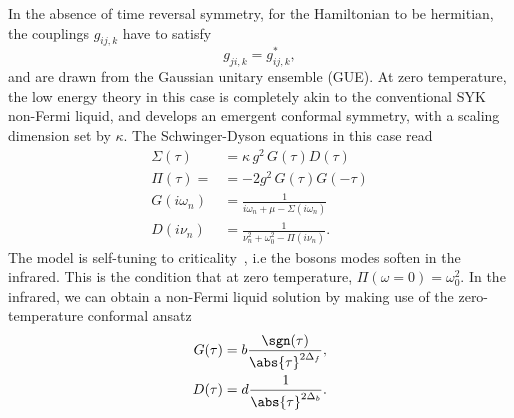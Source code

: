 \par
In the absence of time reversal symmetry, for the Hamiltonian to be hermitian, the couplings $g_{ij,k}$ have to satisfy 
\begin{equation}
    g_{ji,k} = g^*_{ij,k},
\end{equation}
and are drawn from the Gaussian unitary ensemble (GUE). At zero temperature, the low energy theory in this case is completely akin to the conventional SYK non-Fermi liquid, and develops an emergent conformal symmetry, with a scaling dimension set by $\kappa$. 
The Schwinger-Dyson equations in this case read
\begin{subequations}
\begin{align}
    \Sigma(\tau) &= \kappa \, g^2 \, G(\tau) D(\tau) \\
    \Pi(\tau) = &= -2g^2 \, G(\tau)G(-\tau) \\
    G(i\omega_n) &= \frac{1}{i\omega_n + \mu - \Sigma(i\omega_n)} \\
    D(i\nu_n) &= \frac{1}{\nu_n^2 + \omega_0^2 - \Pi(i\nu_n)} .
    \label{eq:SchDysEqnsYSYK_Imag}
\end{align}
\end{subequations}
The model is self-tuning to criticality~\cite{esterlis2019cooper}, i.e the bosons modes soften in the infrared. This is the condition that at zero temperature, $\Pi(\omega = 0) = \omega_0^2$.
In the infrared, we can obtain a non-Fermi liquid solution by making use of the zero-temperature conformal ansatz 
\begin{align}
    G(\tau) &= b\frac{\sgn(\tau)}{\abs{\tau}^{2\Delta_f}} ,\\
    D(\tau) &= d\frac{1}{\abs{\tau}^{2\Delta_b}} .
\end{align}
